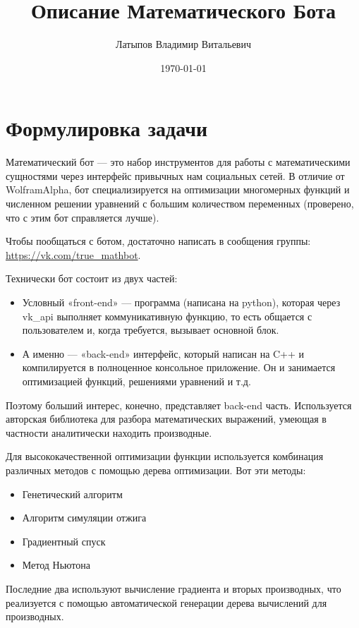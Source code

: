 \documentclass[11pt]{article}
\title{Описание Математического Бота}
\author{Латыпов Владимир Витальевич}
\date{\today}
\begin{document}
    \maketitle
    \newpage

    \tableofcontents
    \newpage


    \section{Формулировка задачи}\label{sec:formulating-task}
    Математический бот — это набор инструментов для работы с математическими сущностями через интерфейс привычных нам социальных сетей.
    В отличие от WolframAlpha, бот специализируется на оптимизации многомерных функций и численном решении уравнений с большим количеством переменных
    (проверено, что с этим бот справляется лучше).

    Чтобы пообщаться с ботом, достаточно написать в сообщения группы: \url{https://vk.com/true_mathbot}.

    Технически бот состоит из двух частей:
    \begin{itemize}
        \item Условный «front-end» — программа (написана на python), которая через vk\_api выполняет коммуникативную функцию, то есть общается с пользователем и,
        когда требуется, вызывает основной блок.
        \item А именно — «back-end» интерфейс, который написан на C++ и компилируется в полноценное консольное приложение.
        Он и занимается оптимизацией функций, решениями уравнений и т.д.
    \end{itemize}

    Поэтому больший интерес, конечно, представляет back-end часть.
    Используется авторская библиотека для разбора математических выражений, умеющая в частности аналитически находить производные.

    Для высококачественной оптимизации функции используется комбинация различных методов с помощью дерева оптимизации.
    Вот эти методы:
    \begin{itemize}
        \item Генетический алгоритм
        \item Алгоритм симуляции отжига
        \item Градиентный спуск
        \item Метод Ньютона
    \end{itemize}
    Последние два используют вычисление градиента и вторых производных, что реализуется с помощью автоматической
    генерации дерева вычислений для производных.
\end{document}
